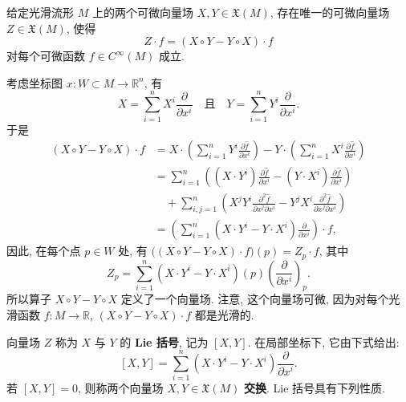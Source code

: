 \begin{RiemannProposition}\label{prop:commutator-of-vector-fields}
给定光滑流形 $M$ 上的两个可微向量场 $X,Y\in\mathfrak{X}(M)$, 存在唯一的可微向量场 $Z\in\mathfrak{X}(M)$, 使得
\[
  Z\cdot f=(X\circ Y-Y\circ X)\cdot f
\]
对每个可微函数 $f\in C^\infty(M)$ 成立.
\end{RiemannProposition}

\begin{RiemannProof}
考虑坐标图 $x:W\subset M\to\mathbb{R}^n$, 有
\[
  X=\sum_{i=1}^nX^i\frac{\partial}{\partial x^i}
  \quad\text{且}\quad
  Y=\sum_{i=1}^nY^i\frac{\partial}{\partial x^i}.
\]
于是
\begin{align*}
  (X\circ Y-Y\circ X)\cdot f
  &=X\cdot\left(\sum_{i=1}^nY^i\frac{\partial\widehat f}{\partial x^i}\right)
    -Y\cdot\left(\sum_{i=1}^nX^i\frac{\partial\widehat f}{\partial x^i}\right)\\
  &=\sum_{i=1}^n\left((X\cdot Y^i)\frac{\partial\widehat f}{\partial x^i}
    -(Y\cdot X^i)\frac{\partial\widehat f}{\partial x^i}\right)\\
  &\quad+\sum_{i,j=1}^n\left(
    X^jY^i\frac{\partial^2\widehat f}{\partial x^j\partial x^i}
    -Y^jX^i\frac{\partial^2\widehat f}{\partial x^j\partial x^i}\right)\\
  &=\left(\sum_{i=1}^n(X\cdot Y^i-Y\cdot X^i)\frac{\partial}{\partial x^i}\right)\cdot f,
\end{align*}
因此, 在每个点 $p\in W$ 处, 有 $\bigl((X\circ Y-Y\circ X)\cdot f\bigr)(p)=Z_p\cdot f$, 其中
\[
  Z_p=\sum_{i=1}^n(X\cdot Y^i-Y\cdot X^i)(p)
  \left(\frac{\partial}{\partial x^i}\right)_p.
\]
所以算子 $X\circ Y-Y\circ X$ 定义了一个向量场. 注意, 这个向量场可微, 因为对每个光滑函数 $f:M\to\mathbb{R}$, $(X\circ Y-Y\circ X)\cdot f$ 都是光滑的.
\end{RiemannProof}

向量场 $Z$ 称为 $X$ 与 $Y$ 的 \textbf{Lie 括号}, 记为 $[X,Y]$. 在局部坐标下, 它由下式给出:
\begin{equation}\label{eq:lie-bracket-in-coordinates}
  [X,Y]=\sum_{i=1}^n(X\cdot Y^i-Y\cdot X^i)\frac{\partial}{\partial x^i}.
\end{equation}
若 $[X,Y]=0$, 则称两个向量场 $X,Y\in\mathfrak{X}(M)$ \textbf{交换}. Lie 括号具有下列性质.

